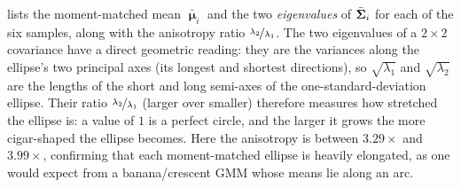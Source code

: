\documentclass[11pt, letterpaper]{article}
\newcommand{\bSigma}{\vb{\Sigma}}
\newcommand{\bmu}{\boldsymbol{\upmu}}
\begin{document}
 lists the moment-matched mean $\bar{\bmu}_i$ and the two \emph{eigenvalues} of $\bar{\bSigma}_i$ for each of the six samples, along with the anisotropy ratio $\nicefrac{\lambda_2}{\lambda_1}$. The two eigenvalues of a $2\times2$ covariance have a direct geometric reading: they are the variances along the ellipse's two principal axes (its longest and shortest directions), so $\sqrt{\lambda_1}$ and $\sqrt{\lambda_2}$ are the lengths of the short and long semi-axes of the one-standard-deviation ellipse. Their ratio $\nicefrac{\lambda_2}{\lambda_1}$ (larger over smaller) therefore measures how stretched the ellipse is: a value of $1$ is a perfect circle, and the larger it grows the more cigar-shaped the ellipse becomes. Here the anisotropy is between $3.29\times$ and $3.99\times$, confirming that each moment-matched ellipse is heavily elongated, as one would expect from a banana/crescent GMM whose means lie along an arc.
\end{document}
